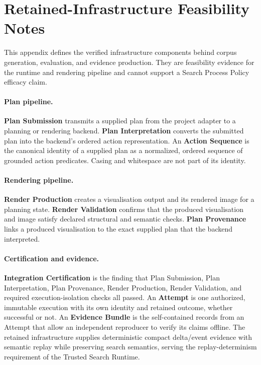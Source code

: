 \section{Retained-Infrastructure Feasibility Notes}

This appendix defines the verified infrastructure components behind corpus generation, evaluation, and evidence production. They are feasibility evidence for the runtime and rendering pipeline and cannot support a Search Process Policy efficacy claim.

\paragraph{Plan pipeline.}
\textbf{Plan Submission} transmits a supplied plan from the project adapter to a planning or rendering backend. \textbf{Plan Interpretation} converts the submitted plan into the backend's ordered action representation. An \textbf{Action Sequence} is the canonical identity of a supplied plan as a normalized, ordered sequence of grounded action predicates. Casing and whitespace are not part of its identity.

\paragraph{Rendering pipeline.}
\textbf{Render Production} creates a visualisation output and its rendered image for a planning state. \textbf{Render Validation} confirms that the produced visualisation and image satisfy declared structural and semantic checks. \textbf{Plan Provenance} links a produced visualisation to the exact supplied plan that the backend interpreted.

\paragraph{Certification and evidence.}
\textbf{Integration Certification} is the finding that Plan Submission, Plan Interpretation, Plan Provenance, Render Production, Render Validation, and required execution-isolation checks all passed. An \textbf{Attempt} is one authorized, immutable execution with its own identity and retained outcome, whether successful or not. An \textbf{Evidence Bundle} is the self-contained records from an Attempt that allow an independent reproducer to verify its claims offline. The retained infrastructure supplies deterministic compact delta/event evidence with semantic replay while preserving search semantics, serving the replay-determinism requirement of the Trusted Search Runtime.

